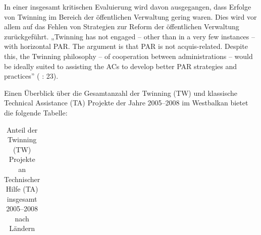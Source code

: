 In einer insgesamt kritischen Evaluierung wird davon ausgegangen, dass Erfolge von Twinning im Bereich der öffentlichen Verwaltung gering waren. Dies wird vor allem auf das Fehlen von Strategien zur Reform der öffentlichen Verwaltung zurückgeführt. „Twinning has not engaged – other than in a very few instances – with horizontal PAR. The argument is that PAR is not acquis-related. Despite this, the Twinning philosophy – of cooperation between administrations – would be ideally suited to assisting the ACs to develop better PAR strategies and practices” (\cite{coojoh} : 23).\par
Einen Überblick über die Gesamtanzahl der Twinning (TW) und klassische Technical Assistance (TA) Projekte der Jahre 2005–2008 im Westbalkan bietet die folgende Tabelle:

\begin{table}[H]
\center
\caption{Anteil der Twinning (TW) Projekte an Technischer Hilfe (TA) insgesamt 2005–2008 nach Ländern}
\scriptsize
\begin{tabular}{|R{16mm}|R{5mm}|R{4mm}|R{7mm}|R{4mm}|R{4mm}|R{7mm}|R{5mm}|R{4mm}|R{7mm}|R{5mm}|R{4mm}|R{7mm}|R{5mm}|R{5mm}|R{7mm}|}\hline


\end{tabular}
\end{table}
